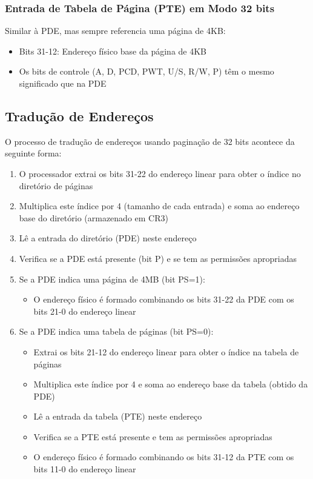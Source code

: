 \subsubsection{Entrada de Tabela de Página (PTE) em Modo 32 bits}

Similar à PDE, mas sempre referencia uma página de 4KB:

\begin{itemize}
    \item Bits 31-12: Endereço físico base da página de 4KB
    \item Os bits de controle (A, D, PCD, PWT, U/S, R/W, P) têm o mesmo significado que na PDE
\end{itemize}

\subsection{Tradução de Endereços}
\label{subsec:traducao_enderecos}

O processo de tradução de endereços usando paginação de 32 bits acontece da seguinte forma:

\begin{enumerate}
    \item O processador extrai os bits 31-22 do endereço linear para obter o índice no diretório de páginas
    \item Multiplica este índice por 4 (tamanho de cada entrada) e soma ao endereço base do diretório (armazenado em CR3)
    \item Lê a entrada do diretório (PDE) neste endereço
    \item Verifica se a PDE está presente (bit P) e se tem as permissões apropriadas
    \item Se a PDE indica uma página de 4MB (bit PS=1):
        \begin{itemize}
            \item O endereço físico é formado combinando os bits 31-22 da PDE com os bits 21-0 do endereço linear
        \end{itemize}
    \item Se a PDE indica uma tabela de páginas (bit PS=0):
        \begin{itemize}
            \item Extrai os bits 21-12 do endereço linear para obter o índice na tabela de páginas
            \item Multiplica este índice por 4 e soma ao endereço base da tabela (obtido da PDE)
            \item Lê a entrada da tabela (PTE) neste endereço
            \item Verifica se a PTE está presente e tem as permissões apropriadas
            \item O endereço físico é formado combinando os bits 31-12 da PTE com os bits 11-0 do endereço linear
        \end{itemize}
\end{enumerate}

